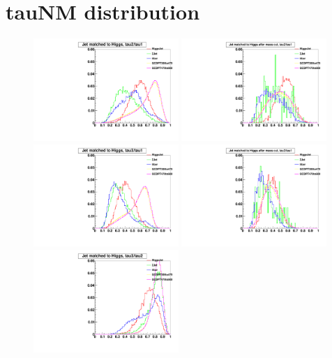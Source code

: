 \newpage
\section{tauNM distribution}
\label{appendix:tauNM}

\begin{figure}[h!tpb]
\begin{center}
\includegraphics[width=0.49\textwidth]{HqqqqZqqfigs/tauNM/Tau21Pre.pdf}
\includegraphics[width=0.49\textwidth]{HqqqqZqqfigs/tauNM/Tau21After.pdf}
\includegraphics[width=0.49\textwidth]{HqqqqZqqfigs/tauNM/Tau31Pre.pdf}
\includegraphics[width=0.49\textwidth]{HqqqqZqqfigs/tauNM/Tau31After.pdf}
\includegraphics[width=0.49\textwidth]{HqqqqZqqfigs/tauNM/Tau32Pre.pdf}

\end{center}
\end{figure}
